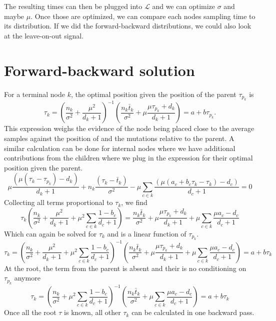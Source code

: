 \documentclass[aps,rmp, onecolumn]{revtex4}
\newcommand{\LH}{\mathcal{L}}
\begin{document}
The resulting times can then be plugged into $\LH$ and we can optimize $\sigma$ and maybe $\mu$.
Once those are optimized, we can compare each nodes sampling time to its distribution.
If we did the forward-backward distributions, we could also look at the leave-on-out signal.

\section*{Forward-backward solution}
For a terminal node $k$, the optimal position given the position of the parent $\tau_{p_k}$ is
\begin{equation}
\tau_k =  \left(\frac{n_k}{\sigma^2} + \frac{\mu^2}{d_k+1}\right)^{-1}\left(\frac{n_k \bar{t}_k}{\sigma^2} + \mu\frac{\mu\tau_{p_k} + d_k}{d_k+1}\right) = a + b\tau_{p_k}.
\end{equation}
This expression weighs the evidence of the node being placed close to the average samples against the position of and the mutations relative to the parent.
A similar calculation can be done for internal nodes where we have additional contributions from the children where we plug in the expression for their optimal position given the parent.
\begin{equation}
    \mu\frac{(\mu(\tau_k - \tau_{p_k}) -  d_k)}{d_k+1} +  n_k\frac{(\tau_k-\bar{t}_k)}{\sigma^2} -  \mu\sum_{c\in k} \frac{(\mu(a_c + b_c \tau_{k} - \tau_{k}) - d_c)}{d_c+1} = 0
\end{equation}
Collecting all terms proportional to $\tau_k$, we find
\begin{equation}
\tau_k\left(\frac{n_k}{\sigma^2} + \frac{\mu^2}{d_k+1} + \mu^2\sum_{c\in k} \frac{1-b_c}{d_c+1}\right) =
\frac{n_k \bar{t}_k}{\sigma^2} + \mu\frac{\mu\tau_{p_k} + d_k}{d_k+1} + \mu \sum_{c\in k}\frac{\mu a_c - d_c}{d_c+1}
\end{equation}
Which can again be solved for $\tau_k$ and is a linear function of $\tau_{p_k}$.
\begin{equation}
    \tau_k =\left(\frac{n_k}{\sigma^2} + \frac{\mu^2}{d_k+1} + \mu^2\sum_{c\in k} \frac{1-b_c}{d_c+1}\right)^{-1}\left(
    \frac{n_k \bar{t}_k}{\sigma^2} + \mu\frac{\mu\tau_{p_k} + d_k}{d_k+1} + \mu \sum_{c\in k}\frac{\mu a_c - d_c}{d_c+1}\right) = a + b \tau_k
\end{equation}
At the root, the term from the parent is absent and their is no conditioning on $\tau_{p_k}$ anymore
\begin{equation}
    \tau_k =\left(\frac{n_k}{\sigma^2} + \mu^2\sum_{c\in k} \frac{1-b_c}{d_c+1}\right)^{-1}\left(
    \frac{n_k \bar{t}_k}{\sigma^2} + \mu \sum_{c\in k}\frac{\mu a_c - d_c}{d_c+1}\right) = a + b \tau_k
\end{equation}
Once all the root $\tau$ is known, all other $\tau_k$ can be calculated in one backward pass.
\end{document}
